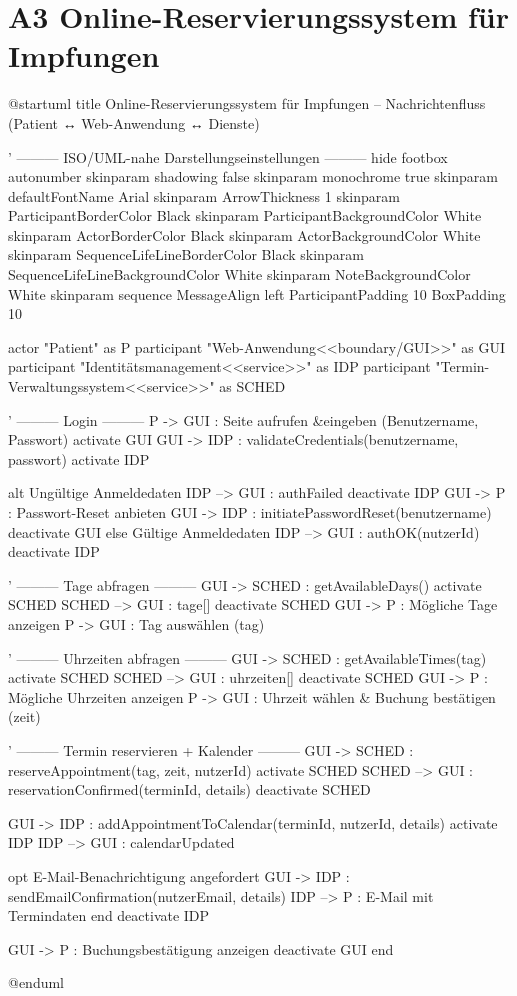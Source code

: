 \documentclass[12pt]{article}
\begin{document}
\section*{A3 Online-Reservierungssystem für Impfungen}
\begin{plantuml}
@startuml
title Online-Reservierungssystem für Impfungen – Nachrichtenfluss (Patient ↔ Web-Anwendung ↔ Dienste)

' ——— ISO/UML-nahe Darstellungseinstellungen ———
hide footbox
autonumber
skinparam shadowing false
skinparam monochrome true
skinparam defaultFontName Arial
skinparam ArrowThickness 1
skinparam ParticipantBorderColor Black
skinparam ParticipantBackgroundColor White
skinparam ActorBorderColor Black
skinparam ActorBackgroundColor White
skinparam SequenceLifeLineBorderColor Black
skinparam SequenceLifeLineBackgroundColor White
skinparam NoteBackgroundColor White
skinparam sequence {
  MessageAlign left
  ParticipantPadding 10
  BoxPadding 10
}

actor "Patient" as P
participant "Web-Anwendung\n<<boundary/GUI>>" as GUI
participant "Identitätsmanagement\n<<service>>" as IDP
participant "Termin-Verwaltungssystem\n<<service>>" as SCHED

' ——— Login ———
P -> GUI : Seite aufrufen &\nAnmeldedaten eingeben (Benutzername, Passwort)
activate GUI
GUI -> IDP : validateCredentials(benutzername, passwort)
activate IDP

alt Ungültige Anmeldedaten
  IDP --> GUI : authFailed
  deactivate IDP
  GUI -> P : Passwort-Reset anbieten
  GUI -> IDP : initiatePasswordReset(benutzername)
  deactivate GUI
else Gültige Anmeldedaten
  IDP --> GUI : authOK(nutzerId)
  deactivate IDP

  ' ——— Tage abfragen ———
  GUI -> SCHED : getAvailableDays()
  activate SCHED
  SCHED --> GUI : tage[]
  deactivate SCHED
  GUI -> P : Mögliche Tage anzeigen
  P -> GUI : Tag auswählen (tag)

  ' ——— Uhrzeiten abfragen ———
  GUI -> SCHED : getAvailableTimes(tag)
  activate SCHED
  SCHED --> GUI : uhrzeiten[]
  deactivate SCHED
  GUI -> P : Mögliche Uhrzeiten anzeigen
  P -> GUI : Uhrzeit wählen & Buchung bestätigen (zeit)

  ' ——— Termin reservieren + Kalender ———
  GUI -> SCHED : reserveAppointment(tag, zeit, nutzerId)
  activate SCHED
  SCHED --> GUI : reservationConfirmed(terminId, details)
  deactivate SCHED

  GUI -> IDP : addAppointmentToCalendar(terminId, nutzerId, details)
  activate IDP
  IDP --> GUI : calendarUpdated

  opt E-Mail-Benachrichtigung angefordert
    GUI -> IDP : sendEmailConfirmation(nutzerEmail, details)
    IDP --> P : E-Mail mit Termindaten
  end
  deactivate IDP

  GUI -> P : Buchungsbestätigung anzeigen
  deactivate GUI
end

@enduml
  
\end{plantuml}
\end{document}
